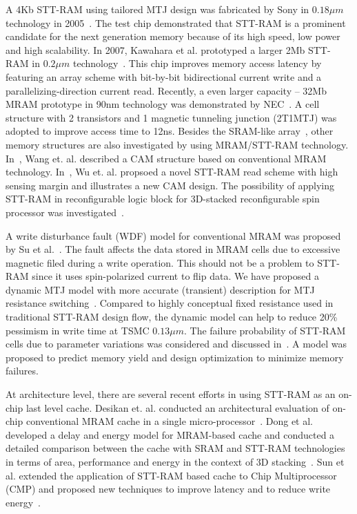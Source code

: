 A 4Kb STT-RAM using tailored MTJ design was fabricated by Sony in $0.18{\mu}m$ technology in 2005~\cite{Hosomi05}. The test chip demonstrated that STT-RAM is a prominent candidate for the next generation memory because of its high speed, low power and high scalability. In 2007, Kawahara et al. prototyped a larger 2Mb STT-RAM in $0.2{\mu}m$ technology~\cite{Kawahara07}. This chip improves memory access latency by featuring an array scheme with bit-by-bit bidirectional current write and a parallelizing-direction current read. Recently, a even larger capacity -- 32Mb MRAM prototype in 90nm technology was demonstrated by NEC~\cite{Nebashi09}. A cell structure with 2 transistors and 1 magnetic tunneling junction (2T1MTJ) was adopted to improve access time to 12ns. Besides the SRAM-like array~\cite{Motoyoshi04,Andre05,Kawahara08}, other memory structures are also investigated by using MRAM/STT-RAM technology. In~\cite{Wang07}, Wang et. al. described a CAM structure based on conventional MRAM technology. In~\cite{Xu08}, Wu et. al. propsoed a novel STT-RAM read scheme with high sensing margin and illustrates a new CAM design. The possibility of applying STT-RAM in reconfigurable logic block for 3D-stacked reconfigurable spin processor was investigated~\cite{Sekikawa08}.

A write disturbance fault (WDF) model for conventional MRAM was proposed by Su et al.~\cite{Su08}. The fault affects the data stored in MRAM cells due to excessive magnetic filed during a write operation.
This should not be a problem to STT-RAM since it uses spin-polarized current to flip data. We have proposed a dynamic MTJ model with more accurate (transient) description for MTJ resistance switching~\cite{Chen08}. Compared to highly conceptual fixed resistance used in traditional STT-RAM design flow, the dynamic model can help to reduce 20\% pessimism in write time at TSMC $0.13{\mu}m$. The failure probability of STT-RAM cells due to parameter variations was considered and discussed in~\cite{Li09}. A model was proposed to predict memory yield and design optimization to minimize memory failures.

At architecture level, there are several recent efforts in using STT-RAM as an on-chip last level cache. Desikan et. al. conducted an architectural evaluation of on-chip conventional MRAM cache in a single micro-processor~\cite{Desikan02}. Dong et al. developed a delay and energy model for MRAM-based cache and conducted a detailed comparison between the cache with SRAM and STT-RAM technologies in terms of area, performance and energy in the context of 3D stacking~\cite{MRAM:DONG08}. Sun et al. extended the application of STT-RAM based cache to Chip Multiprocessor (CMP) and proposed new techniques to improve latency and to reduce write energy~\cite{Sun09}.

